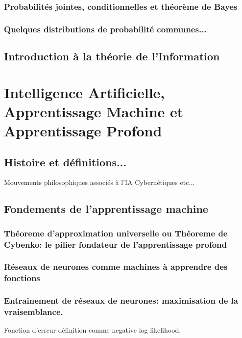 \documentclass[titlepage]{article}
\theoremstyle{cleanremark}
\begin{document}
\subsubsection{Probabilités jointes, conditionnelles et théorème de Bayes}

\subsubsection{Quelques distributions de probabilité communes...}


\subsection{Introduction à la théorie de l'Information}



\section{Intelligence Artificielle, Apprentissage Machine et Apprentissage Profond}\label{sec:ai}


\subsection{Histoire et définitions...}
Mouvements philosophiques associés à l'IA 
Cybernétiques etc...

\subsection{Fondements de l'apprentissage machine}

\subsubsection{Théoreme d'approximation universelle ou Théoreme de Cybenko: le pilier fondateur de l'apprentissage profond}

\subsubsection{Réseaux de neurones comme machines à apprendre des fonctions}

\subsubsection{Entrainement de réseaux de neurones: maximisation de la vraisemblance.}
Fonction d'erreur définition comme negative log likelihood. 
\end{document}
